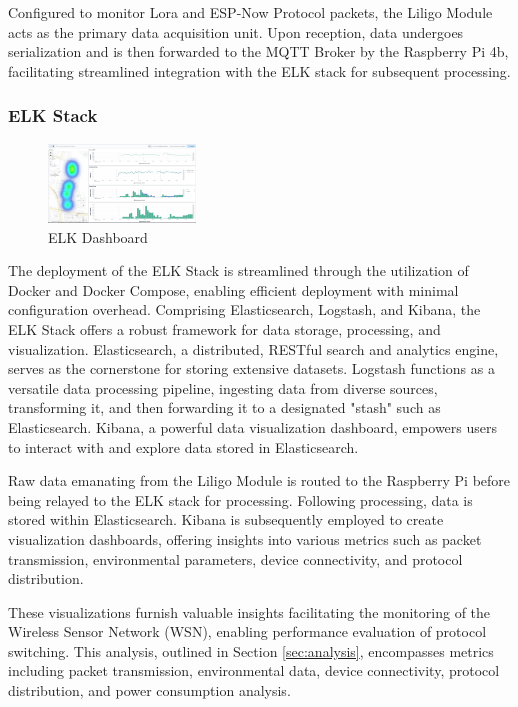Configured to monitor Lora and ESP-Now Protocol packets, the Liligo Module acts as the primary data acquisition unit. Upon reception, data undergoes serialization and is then forwarded to the MQTT Broker by the Raspberry Pi 4b, facilitating streamlined integration with the ELK stack for subsequent processing.

\subsubsection{ELK Stack}\label{sec:elk}
\begin{figure}[h]
  \begin{center}
    \includegraphics[width=0.35\textwidth]{./Figures/elk/elk_dashboard.png}
  \end{center}
  \caption{ELK Dashboard}\label{fig:elk_dashboard}
\end{figure}

The deployment of the ELK Stack is streamlined through the utilization of Docker and Docker Compose, enabling efficient deployment with minimal configuration overhead. Comprising Elasticsearch, Logstash, and Kibana, the ELK Stack offers a robust framework for data storage, processing, and visualization. Elasticsearch, a distributed, RESTful search and analytics engine, serves as the cornerstone for storing extensive datasets. Logstash functions as a versatile data processing pipeline, ingesting data from diverse sources, transforming it, and then forwarding it to a designated "stash" such as Elasticsearch. Kibana, a powerful data visualization dashboard, empowers users to interact with and explore data stored in Elasticsearch.

Raw data emanating from the Liligo Module is routed to the Raspberry Pi before being relayed to the ELK stack for processing. Following processing, data is stored within Elasticsearch. Kibana is subsequently employed to create visualization dashboards, offering insights into various metrics such as packet transmission, environmental parameters, device connectivity, and protocol distribution.

These visualizations furnish valuable insights facilitating the monitoring of the Wireless Sensor Network (WSN), enabling performance evaluation of protocol switching. This analysis, outlined in Section \ref{sec:analysis}, encompasses metrics including packet transmission, environmental data, device connectivity, protocol distribution, and power consumption analysis.

